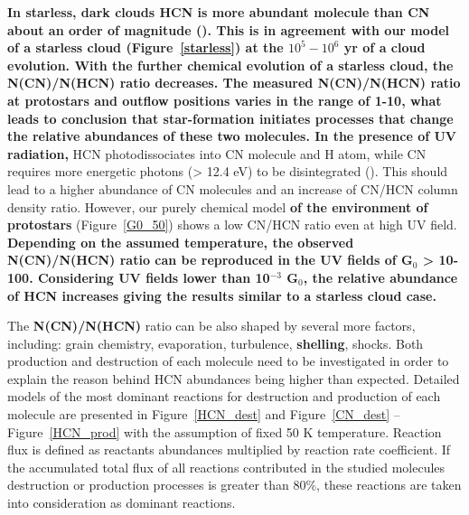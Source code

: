 \documentclass{aa}
\begin{document}

 
\textbf{In starless, dark clouds HCN is more abundant molecule than CN about an order of magnitude (\citealt{Pra97}). This is in agreement with our model of a starless cloud (Figure~\ref{starless}) at the $10^5-10^6$ yr of a cloud evolution. With the further chemical evolution of a starless cloud, the N(CN)/N(HCN) ratio decreases. The measured N(CN)/N(HCN) ratio at protostars and outflow positions varies in the range of 1-10, what leads to conclusion that star-formation initiates processes that change the relative abundances of these two molecules. In the presence of UV radiation,} HCN photodissociates into CN molecule and H atom, while CN requires more energetic photons (> 12.4 eV) to be disintegrated (\citealt{vDi87}). This should lead to a higher abundance of CN molecules and an increase of CN/HCN column density ratio. However, our purely chemical model \textbf{of the environment of protostars} (Figure~\ref{G0_50}) shows a low CN/HCN ratio even at high UV field. \textbf{Depending on the assumed temperature, the observed \textbf{N(CN)/N(HCN)} ratio can be reproduced in the UV fields of G$_0$ > 10-100. Considering UV fields lower than 10$^{-3}$ G$_0$, the relative abundance of HCN increases giving the results similar to a starless cloud case.}

The \textbf{N(CN)/N(HCN)} ratio can be also shaped by several more factors, including: grain chemistry, evaporation, turbulence, \textbf{shelling}, shocks. Both production and destruction of each molecule need to be investigated in order to explain the reason behind HCN abundances being higher than expected. Detailed models of the most dominant
reactions for destruction and production of each molecule are presented in Figure~\ref{HCN_dest}  and Figure~\ref{CN_dest} – Figure~\ref{HCN_prod} with the assumption of fixed 50 K temperature. Reaction flux is defined as
reactants abundances multiplied by reaction rate coefficient. If the accumulated total flux of all reactions contributed in the studied molecules destruction or production processes is greater than 80$\%$, these reactions are taken into consideration as dominant reactions.
\end{document}
